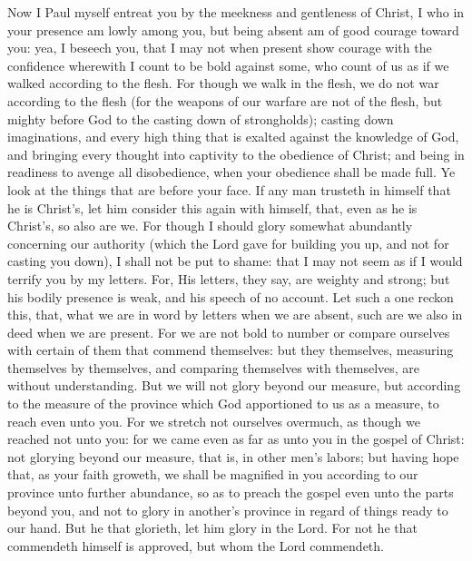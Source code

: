 Now I Paul myself entreat you by the meekness and gentleness of Christ, I who in your presence am lowly among you, but being absent am of good courage toward you: yea, I beseech you, that I may not when present show courage with the confidence wherewith I count to be bold against some, who count of us as if we walked according to the flesh. For though we walk in the flesh, we do not war according to the flesh (for the weapons of our warfare are not of the flesh, but mighty before God to the casting down of strongholds); casting down imaginations, and every high thing that is exalted against the knowledge of God, and bringing every thought into captivity to the obedience of Christ; and being in readiness to avenge all disobedience, when your obedience shall be made full. Ye look at the things that are before your face. If any man trusteth in himself that he is Christ’s, let him consider this again with himself, that, even as he is Christ’s, so also are we. For though I should glory somewhat abundantly concerning our authority (which the Lord gave for building you up, and not for casting you down), I shall not be put to shame: that I may not seem as if I would terrify you by my letters. For, His letters, they say, are weighty and strong; but his bodily presence is weak, and his speech of no account. Let such a one reckon this, that, what we are in word by letters when we are absent, such are we also in deed when we are present. For we are not bold to number or compare ourselves with certain of them that commend themselves: but they themselves, measuring themselves by themselves, and comparing themselves with themselves, are without understanding. But we will not glory beyond our measure, but according to the measure of the province which God apportioned to us as a measure, to reach even unto you. For we stretch not ourselves overmuch, as though we reached not unto you: for we came even as far as unto you in the gospel of Christ: not glorying beyond our measure, that is, in other men’s labors; but having hope that, as your faith groweth, we shall be magnified in you according to our province unto further abundance, so as to preach the gospel even unto the parts beyond you, and not to glory in another’s province in regard of things ready to our hand. But he that glorieth, let him glory in the Lord. For not he that commendeth himself is approved, but whom the Lord commendeth. 


